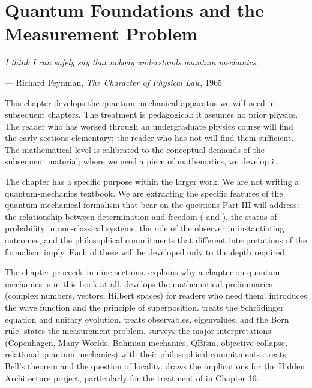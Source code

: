 \chapter{Quantum Foundations and the Measurement Problem}
\label{ch:quantum-foundations}

\epigraph{\itshape I think I can safely say that nobody understands
quantum mechanics.}{--- Richard Feynman, \textit{The Character of
Physical Law}, 1965}

\noindent
This chapter develops the quantum-mechanical apparatus we will need
in subsequent chapters. The treatment is pedagogical: it assumes no
prior physics. The reader who has worked through an undergraduate
physics course will find the early sections elementary; the reader
who has not will find them sufficient. The mathematical level is
calibrated to the conceptual demands of the subsequent material;
where we need a piece of mathematics, we develop it.

The chapter has a specific purpose within the larger work. We are
not writing a quantum-mechanics textbook. We are extracting the
specific features of the quantum-mechanical formalism that bear on
the questions Part III will address: the relationship between
determination and freedom ( and ), the
status of probability in non-classical systems, the role of the
observer in instantiating outcomes, and the philosophical commitments
that different interpretations of the formalism imply. Each of these
will be developed only to the depth required.

The chapter proceeds in nine sections.
 explains why a chapter on quantum mechanics is in
this book at all.
 develops the mathematical preliminaries
(complex numbers, vectors, Hilbert spaces) for readers who need them.
 introduces the wave function and the
principle of superposition.
 treats the Schr\"odinger equation and unitary
evolution.
 treats observables, eigenvalues, and the Born
rule.
 states the measurement problem.
 surveys the major interpretations
(Copenhagen, Many-Worlds, Bohmian mechanics, QBism, objective
collapse, relational quantum mechanics) with their philosophical
commitments.
 treats Bell's theorem and the question of locality.
 draws the implications for the Hidden
Architecture project, particularly for the treatment of 
in Chapter 16.

